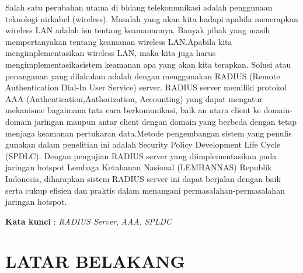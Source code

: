 \documentclass{jtetiproposalskripsi}
\begin{document}
\cover

\approvalpage


\begin{abstractind}
Salah satu perubahan utama di bidang telekomunikasi adalah penggunaan teknologi nirkabel (wireless). Masalah yang akan kita hadapi apabila menerapkan wireless LAN adalah isu tentang keamanannya. Banyak pihak yang masih mempertanyakan tentang keamanan wireless LAN.Apabila kita mengimplementasikan wireless LAN, maka kita juga harus mengimplementasikasistem keamanan apa yang akan kita terapkan. Solusi atau penanganan yang dilakukan adalah dengan menggunakan RADIUS (Remote Authentication Dial-In
User Service) server. RADIUS server memiliki protokol AAA (Authentication,Authorization, Accounting) yang dapat mengatur mekanisme bagaimana tata cara berkomunikasi, baik an ntara client ke domain-domain jaringan maupun antar client dengan domain yang berbeda dengan tetap menjaga keamanan pertukaran data.Metode pengembangan sistem yang penulis gunakan dalam penelitian ini adalah Security Policy Development Life Cycle (SPDLC). Dengan pengujian RADIUS server yang diimplementasikan pada jaringan hotspot Lembaga Ketahanan Nasional (LEMHANNAS) Republik Indonesia, diharapkan sistem RADIUS server ini dapat berjalan dengan baik serta cukup efisien dan praktis dalam
menangani permasalahan-permasalahan jaringan hotspot.





\bigskip
\textbf{Kata kunci} : \emph{RADIUS Server}, \emph{AAA}, \emph{SPLDC}
\end{abstractind}

\tableofcontents
{}
\clearpage{}\setcounter{page}{1}

\chapter{LATAR BELAKANG}
\end{document}
